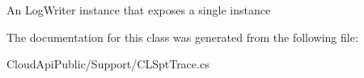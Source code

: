 An Log\-Writer instance that exposes a single instance 



The documentation for this class was generated from the following file\-:\begin{DoxyCompactItemize}
\item 
Cloud\-Api\-Public/\-Support/C\-L\-Spt\-Trace.\-cs\end{DoxyCompactItemize}
